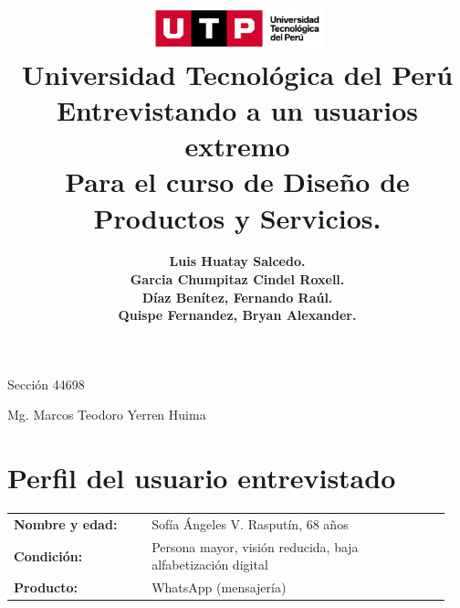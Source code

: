 \documentclass{article}
\title{
  \includegraphics[width=5cm]{./assets/logo-utp.png} \\
  \vspace{1cm}
  \textbf{Universidad Tecnológica del Perú} \\
  \vspace{2cm}
  \textbf{Entrevistando a un usuarios extremo} \\
  \vspace{1cm}
  \large \textbf{Para el curso de Diseño de Productos y Servicios.}
}
\author{
  \textbf{Luis Huatay Salcedo.} \\
  \textbf{Garcia Chumpitaz Cindel Roxell.} \\
  \textbf{Díaz Benítez, Fernando Raúl.} \\
  \textbf{Quispe Fernandez, Bryan Alexander.}
}
\begin{document}
\maketitle
\begin{center}
  Sección 44698
\end{center}
\thispagestyle{empty}
\begin{center}
  Mg. Marcos Teodoro Yerren Huima  
\end{center}
\restoregeometry




\newpage


\section*{Perfil del usuario entrevistado}
\begin{center}
  \begin{tabular}{p{0.3\linewidth} p{0.65\linewidth}}
    \textbf{Nombre y edad:}   & Sofía Ángeles V. Rasputín, 68 años \\
    \textbf{Condición:}       & Persona mayor, visión reducida, baja alfabetización digital \\
    \textbf{Producto:}        & WhatsApp (mensajería) \\
  \end{tabular}
\end{center}
\end{document}
